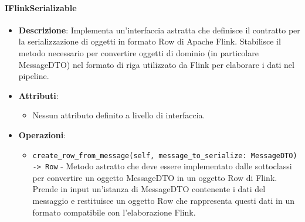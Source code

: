 \documentclass[10pt]{article}
\begin{document}
    \paragraph{IFlinkSerializable}
    \begin{itemize} 
    \item \textbf{Descrizione}: Implementa un'interfaccia astratta che definisce il contratto per la serializzazione di oggetti in formato Row di Apache Flink. Stabilisce il metodo necessario per convertire oggetti di dominio (in particolare MessageDTO) nel formato di riga utilizzato da Flink per elaborare i dati nel pipeline.
    \item \textbf{Attributi}:
    \begin{itemize}
        \item Nessun attributo definito a livello di interfaccia.
    \end{itemize}
    
    \item \textbf{Operazioni}:
    \begin{itemize}
        \item \texttt{create\_row\_from\_message(self, message\_to\_serialize: MessageDTO) -> Row} - Metodo astratto che deve essere implementato dalle sottoclassi per convertire un oggetto MessageDTO in un oggetto Row di Flink. Prende in input un'istanza di MessageDTO contenente i dati del messaggio e restituisce un oggetto Row che rappresenta questi dati in un formato compatibile con l'elaborazione Flink.
    \end{itemize}
    \end{itemize}
\end{document}
